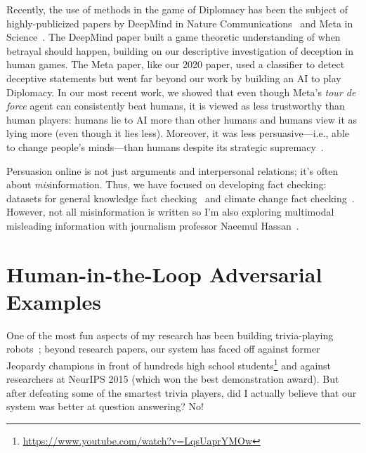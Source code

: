Recently, the use of  methods in the game of Diplomacy has
been the subject of highly-publicized papers by DeepMind in Nature
Communications~\cite{kramar-22} and Meta in Science~\cite{bakhtin-22}.
%
The DeepMind paper built a game theoretic understanding of when
betrayal should happen, building on our descriptive investigation of
deception in human games.
%
The Meta paper, like our 2020 paper, used a classifier to detect
deceptive statements but went far beyond our work by building an AI to play Diplomacy.
%
In our most recent work, we showed that even though Meta's \textit{tour de force} agent can consistently beat humans, it is viewed as less trustworthy than human players: humans lie to AI more than other humans and humans view it as lying more (even though it lies less).
%
Moreover, it was less persuasive---i.e., able to change people's minds---than humans despite its strategic supremacy~\cite{Wongkamjan-2024}.


Persuasion online is not just arguments and interpersonal relations; it's often about \emph{mis}information.
%
Thus, we have focused on developing fact checking: datasets
for general knowledge fact checking~\cite{eisenschlos-21} and climate
change fact checking~\cite{Diggelmann-20}.
%
However, not all misinformation is written so I'm also exploring multimodal misleading information with journalism professor Naeemul Hassan~\cite{Sung:Hassan:Boyd-Graber-2023}.

\section{Human-in-the-Loop Adversarial Examples}

One of the most fun aspects of my research has been building
trivia-playing robots~\cite{boyd-graber-12,iyyer-14b,iyyer-15}; beyond research papers, our system has faced off against former Jeopardy
champions in front of hundreds high school
students\footnote{\url{https://www.youtube.com/watch?v=LqsUaprYMOw}}
and against researchers at NeurIPS 2015 (which won the best
demonstration award).
%
But after defeating some of the smartest trivia players, did I
actually believe that our system was better at question answering?
%
No!

